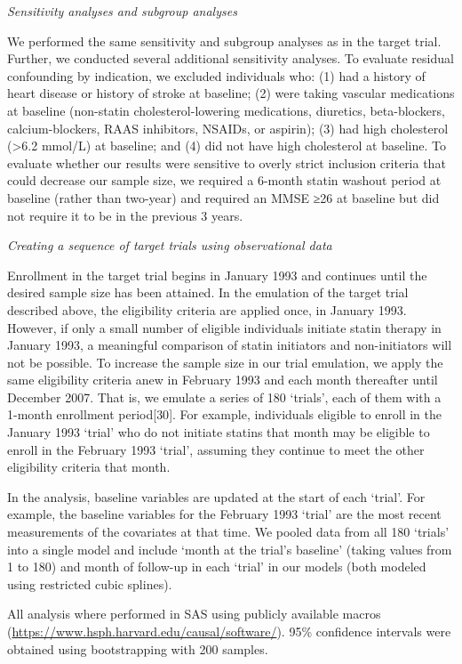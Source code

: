 \documentclass[
]{book}
\begin{document}
\emph{Sensitivity analyses and subgroup analyses}

We performed the same sensitivity and subgroup analyses as in the target trial. Further, we conducted several additional sensitivity analyses. To evaluate residual confounding by indication, we excluded individuals who: (1) had a history of heart disease or history of stroke at baseline; (2) were taking vascular medications at baseline (non-statin cholesterol-lowering medications, diuretics, beta-blockers, calcium-blockers, RAAS inhibitors, NSAIDs, or aspirin); (3) had high cholesterol (\textgreater6.2 mmol/L) at baseline; and (4) did not have high cholesterol at baseline. To evaluate whether our results were sensitive to overly strict inclusion criteria that could decrease our sample size, we required a 6-month statin washout period at baseline (rather than two-year) and required an MMSE ≥26 at baseline but did not require it to be in the previous 3 years.

\emph{Creating a sequence of target trials using observational data}

Enrollment in the target trial begins in January 1993 and continues until the desired sample size has been attained. In the emulation of the target trial described above, the eligibility criteria are applied once, in January 1993. However, if only a small number of eligible individuals initiate statin therapy in January 1993, a meaningful comparison of statin initiators and non-initiators will not be possible. To increase the sample size in our trial emulation, we apply the same eligibility criteria anew in February 1993 and each month thereafter until December 2007. That is, we emulate a series of 180 `trials', each of them with a 1-month enrollment period{[}30{]}. For example, individuals eligible to enroll in the January 1993 `trial' who do not initiate statins that month may be eligible to enroll in the February 1993 `trial', assuming they continue to meet the other eligibility criteria that month.

In the analysis, baseline variables are updated at the start of each `trial'. For example, the baseline variables for the February 1993 `trial' are the most recent measurements of the covariates at that time. We pooled data from all 180 `trials' into a single model and include `month at the trial's baseline' (taking values from 1 to 180) and month of follow-up in each `trial' in our models (both modeled using restricted cubic splines).

All analysis where performed in SAS using publicly available macros (\url{https://www.hsph.harvard.edu/causal/software/}). 95\% confidence intervals were obtained using bootstrapping with 200 samples.
\end{document}
